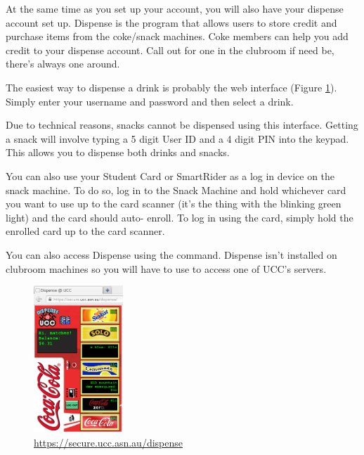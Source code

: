 

\null
At the same time as you set up your account, you will also have your dispense account set up. Dispense is the program that allows users to store credit and purchase items from the coke/snack machines. Coke members can help you add credit to your dispense account. Call out for one in the clubroom if need be, there's always one around.


The easiest way to dispense a drink is probably the web interface (Figure \ref{webdispense.png}). Simply enter your username and password and then select a drink. 

Due to technical reasons, snacks cannot be dispensed using this interface. Getting a snack will involve typing a 5 digit User ID and a 4 digit PIN into the keypad. This allows you to dispense both drinks and snacks.

You can also use your Student Card or SmartRider as a log in device on the snack machine. To do so, log in to the Snack Machine and hold whichever card you want to use up to the card scanner (it's the thing with the blinking green light) and the card should auto- enroll. To log in using the card, simply hold the enrolled card up to the card scanner.


You can also access Dispense using the  command. Dispense isn't installed on clubroom machines so you will have to use  to access one of UCC's servers.




\begin{figure}[H]
	\centering
	\includegraphics[width=0.3\textwidth]{figures/webdispense.png}
	\caption{\url{https://secure.ucc.asn.au/dispense}} 
	\label{webdispense.png}
\end{figure}
%
%
